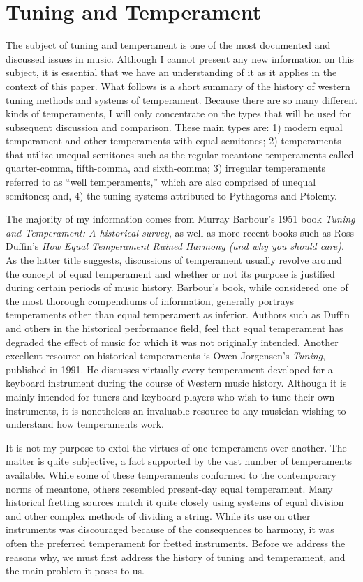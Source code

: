 \chapter{Tuning and Temperament}

The subject of tuning and temperament is one of the most documented and discussed issues in music. Although I
cannot present any new information on this subject, it is essential that we have an understanding of it as it applies in
the context of this paper. What follows is a short summary of the history of western tuning methods and systems of
temperament. Because there are so many different kinds of temperaments, I will only concentrate on the types that will
be used for subsequent discussion and comparison. These main types are: 1) modern equal temperament and other
temperaments with equal semitones; 2) temperaments that utilize unequal semitones such as the regular meantone
temperaments called quarter-comma, fifth-comma, and sixth-comma; 3) irregular temperaments referred to as ``well
temperaments,'' which are also comprised of unequal semitones; and, 4) the tuning systems attributed to Pythagoras and
Ptolemy.

The majority of my information comes from Murray Barbour's 1951 book \textit{Tuning and Temperament: A historical
survey}, as well as more recent books such as Ross Duffin's \textit{How Equal Temperament Ruined Harmony (and why you
should care)}. As the latter title suggests, discussions of temperament usually revolve around the concept of equal
temperament and whether or not its purpose is justified during certain periods of music history. Barbour's book, while
considered one of the most thorough compendiums of information, generally portrays temperaments other than equal
temperament as inferior. Authors such as Duffin and others in the historical performance field, feel that equal
temperament has degraded the effect of music for which it was not originally intended. Another excellent resource on
historical temperaments is Owen Jorgensen's \textit{Tuning}, published in 1991. He discusses virtually every
temperament developed for a keyboard instrument during the course of Western music history. Although it is mainly
intended for tuners and keyboard players who wish to tune their own instruments, it is nonetheless an invaluable
resource to any musician wishing to understand how temperaments work.

It is not my purpose to extol the virtues of one temperament over another. The matter is quite subjective, a fact
supported by the vast number of temperaments available.  While some of these temperaments conformed to the contemporary
norms of meantone, others resembled present-day equal temperament. Many historical fretting sources match it quite
closely using systems of equal division and other complex methods of dividing a string. While its use on other
instruments was discouraged because of the consequences to harmony, it was often the preferred temperament for fretted
instruments. Before we address the reasons why, we must first address the history of tuning and temperament, and the
main problem it poses to us.

